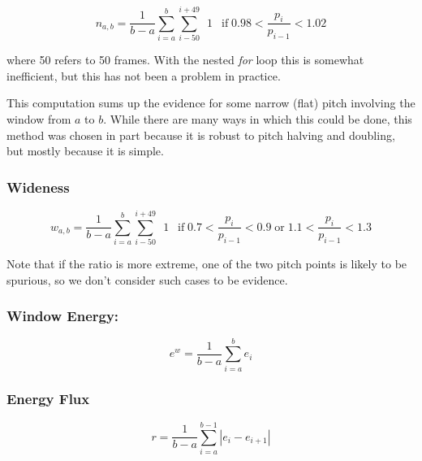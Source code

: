 \documentclass[11pt]{article}
\begin{document}
\begin{equation}
n_{a,b} = \frac{1}{b-a} \sum\limits_{i=a}^b \sum\limits_{i-50}^{i+49} \enspace 1 \enspace \operatorname{if} 0.98 <  \frac{p_i}{p_{i-1}} < 1.02 
\end{equation}

where 50 refers to 50 frames.  With the nested {\em for} loop this is
somewhat inefficient, but this has not been a problem in practice.

This computation sums up the evidence for some narrow (flat) pitch
involving the window from $a$ to $b$.  While there are many ways in
which this could be done, this method was chosen in part because it is
robust to pitch halving and doubling, but mostly because it is simple.




\subsubsection{Wideness}

\begin{equation}
w_{a,b} = \frac{1}{b-a} \sum\limits_{i=a}^b \sum\limits_{i-50}^{i+49} \enspace 1 \enspace \operatorname{if} 0.7 <  \frac{p_i}{p_{i-1}} < 0.9 \operatorname{or} 1.1 <  \frac{p_i}{p_{i-1}} < 1.3
\end{equation}

Note that if the ratio is more extreme, one of the two pitch points is
likely to be spurious, so we don't consider such cases to be evidence.


\bigskip
\subsubsection{Window Energy:}

\begin{equation}
e^w = \frac{1}{b - a} \sum\limits_{i=a}^{b}e_i
\end{equation}

\subsubsection{Energy Flux}
\begin{equation}
r = \frac{1}{b - a} \sum\limits_{i=a}^{b-1}|e_i - e_{i+1}|
\end{equation}
\end{document}
